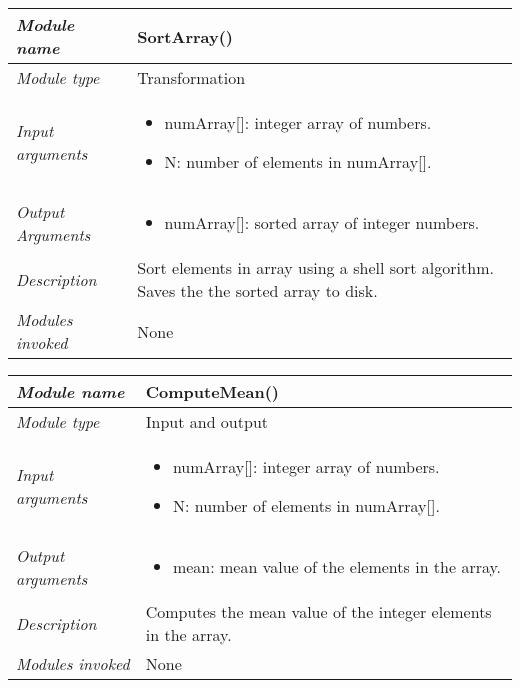 \begin{table}[h]
\begin{tabular}{|l|m{10cm}|}
\hline
\emph{Module name} & SortArray() \\ \hline
\emph{Module type} & Transformation \\ \hline
\emph{Input arguments} & 
\begin{itemize}
\item   numArray{[}{]}: integer array of numbers.
\item   N: number of elements in numArray{[}{]}.
\end{itemize}  \\ \hline
\emph{Output Arguments} & 
\begin{itemize}
\item  numArray{[}{]}: sorted array of integer numbers.
\end{itemize} \\ \hline
\emph{Description} & Sort elements in array using a shell sort
algorithm. Saves the the sorted array to disk. \\ \hline
\emph{Modules invoked} & None \\ \hline
\end{tabular}
\vspace{0.2cm}

\begin{tabular}{|l|m{10cm}|}
\hline
\emph{Module name} & ComputeMean()\\ \hline
\emph{Module type} & Input and output \\ \hline
\emph{Input arguments} & 
\begin{itemize}
\item  numArray{[}{]}: integer array of numbers.
\item  N: number of elements in numArray{[}{]}.
\end{itemize} \\ \hline
\emph{Output arguments} & 
\begin{itemize}
\item  mean: mean value of the elements in the array.
\end{itemize} \\ \hline
\emph{Description} & Computes the mean value of the integer elements in
the array. \\ \hline
\emph{Modules invoked} & None \\ \hline
\end{tabular}

\end{table}



